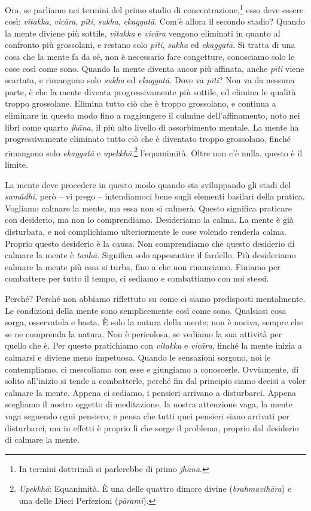 Ora, se parliamo nei termini del primo stadio di
concentrazione,\footnote{In termini dottrinali si parlerebbe di primo
  \emph{jhāna}.} esso deve essere così: \emph{vitakka}, \emph{vicāra},
\emph{pīti}, \emph{sukha}, \emph{ekaggatā}. Com'è allora il secondo
stadio? Quando la mente diviene più sottile, \emph{vitakka} e
\emph{vicāra} vengono eliminati in quanto al confronto più grossolani, e
restano solo \emph{pīti}, \emph{sukha} ed \emph{ekaggatā}. Si tratta di
una cosa che la mente fa da sé, non è necessario fare congetture,
conosciamo solo le cose così come sono. Quando la mente diventa ancor
più affinata, anche \emph{pīti} viene scartata, e rimangono solo
\emph{sukha} ed \emph{ekaggatā.} Dove va \emph{pīti}? Non va da nessuna
parte, è che la mente diventa progressivamente più sottile, ed elimina
le qualità troppo grossolane. Elimina tutto ciò che è troppo grossolano,
e continua a eliminare in questo modo fino a raggiungere il culmine
dell'affinamento, noto nei libri come quarto \emph{jhāna}, il più alto
livello di assorbimento mentale. La mente ha progressivamente eliminato
tutto ciò che è diventato troppo grossolano, finché rimangono solo
\emph{ekaggatā} e \emph{upekkhā},\footnote{\emph{Upekkhā}: Equanimità. È
  una delle quattro dimore divine (\emph{brahmavihāra}) e una delle
  Dieci Perfezioni (\emph{pāramī}).} l'equanimità. Oltre non c'è nulla,
questo è il limite.

La mente deve procedere in questo modo quando sta sviluppando gli stadi
del \emph{samādhi}, però -- vi prego -- intendiamoci bene sugli elementi
basilari della pratica. Vogliamo calmare la mente, ma essa non si
calmerà. Questo significa praticare con desiderio, ma non lo
comprendiamo. Desideriamo la calma. La mente è già disturbata, e noi
complichiamo ulteriormente le cose volendo renderla calma. Proprio
questo desiderio è la causa. Non comprendiamo che questo desiderio di
calmare la mente è \emph{tanhā}. Significa solo appesantire il fardello.
Più desideriamo calmare la mente più essa si turba, fino a che non
rinunciamo. Finiamo per combattere per tutto il tempo, ci sediamo e
combattiamo con noi stessi.

Perché? Perché non abbiamo riflettuto su come ci siamo predisposti
mentalmente. Le condizioni della mente sono semplicemente così come
sono. Qualsiasi cosa sorga, osservatela e basta. È solo la natura della
mente; non è nociva, sempre che se ne comprenda la natura. Non è
pericolosa, se vediamo la sua attività per quello che è. Per questo
pratichiamo con \emph{vitakka} e \emph{vicāra}, finché la mente inizia a
calmarsi e diviene meno impetuosa. Quando le sensazioni sorgono, noi le
contempliamo, ci mescoliamo con esse e giungiamo a conoscerle.
Ovviamente, di solito all'inizio si tende a combatterle, perché fin dal
principio siamo decisi a voler calmare la mente. Appena ci sediamo, i
pensieri arrivano a disturbarci. Appena scegliamo il nostro oggetto di
meditazione, la nostra attenzione vaga, la mente vaga seguendo ogni
pensiero, e pensa che tutti quei pensieri siano arrivati per
disturbarci, ma in effetti è proprio lì che sorge il problema, proprio
dal desiderio di calmare la mente.

